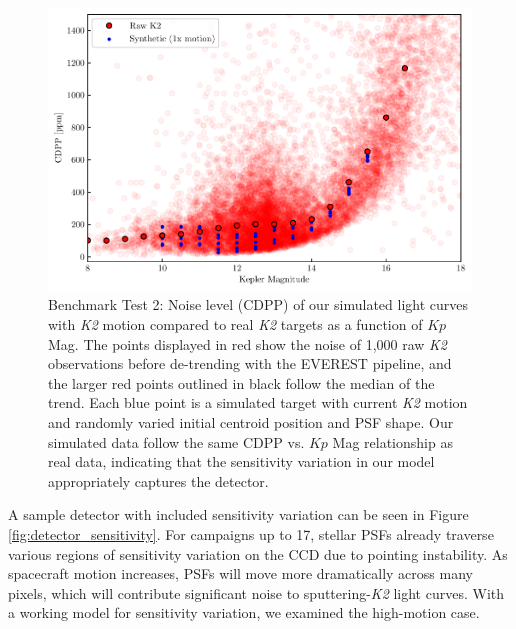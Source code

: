\documentclass[12pt,preprint]{aastex}
\begin{document}
\begin{figure}[h]
	\centering
	\includegraphics[width=1.0\linewidth]{k2_benchmark.pdf}
	\caption{Benchmark Test 2: Noise level (CDPP) of our simulated light curves with \textit{K2} motion compared to real \textit{K2} targets as a function of $Kp$ Mag. The points displayed in red show the noise of 1,000 raw \textit{K2} observations before de-trending with the EVEREST pipeline, and the larger red points outlined in black follow the median of the trend. Each blue point is a simulated target with current \textit{K2} motion and randomly varied initial centroid position and PSF shape. Our simulated data follow the same CDPP vs. $Kp$ Mag relationship as real data, indicating that the sensitivity variation in our model appropriately captures the detector.}
	\label{fig:1motion}
\end{figure}
A sample detector with included sensitivity variation can be seen in Figure \ref{fig:detector_sensitivity}.  For campaigns up to 17, stellar PSFs already traverse various regions of sensitivity variation on the CCD due to pointing instability. As spacecraft motion increases, PSFs will move more dramatically across many pixels, which will contribute significant noise to sputtering-\textit{K2} light curves. With a working model for sensitivity variation, we examined the high-motion case.
\end{document}
